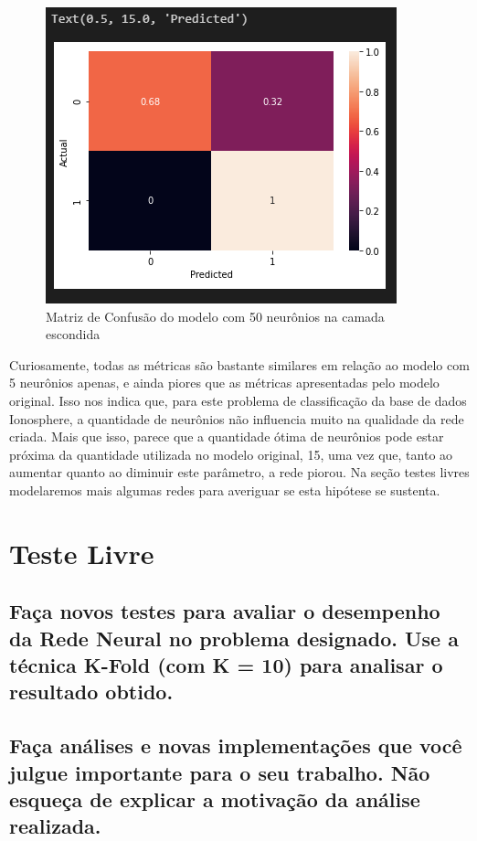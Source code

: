 \documentclass[12pt]{article}
\begin{document}
\begin{figure}[H]
	\centering
	\includegraphics[width=0.7\linewidth]{Imagens/50neuronios/confusao50neuronios}
	\caption{Matriz de Confusão do modelo com 50 neurônios na camada escondida}
	\label{fig:confusao50neuronios}
\end{figure}

Curiosamente, todas as métricas são bastante similares em relação ao modelo com 5 neurônios apenas, e ainda piores que as métricas apresentadas pelo modelo original. Isso nos indica que, para este problema de classificação da base de dados Ionosphere, a quantidade de neurônios não influencia muito na qualidade da rede criada. Mais que isso, parece que a quantidade ótima de neurônios pode estar próxima da quantidade utilizada no modelo original, 15, uma vez que, tanto ao aumentar quanto ao diminuir este parâmetro, a rede piorou. Na seção testes livres modelaremos mais algumas redes para averiguar se esta hipótese se sustenta.

\section{Teste Livre}\label{sec:testelivre}

\subsection{Faça novos testes para avaliar o desempenho da Rede Neural no	problema designado. Use a técnica K-Fold (com K = 10) para analisar o	resultado obtido.}

\subsection{Faça análises e novas implementações que você julgue importante para o seu trabalho. Não esqueça de explicar a motivação da análise realizada.}
\end{document}
